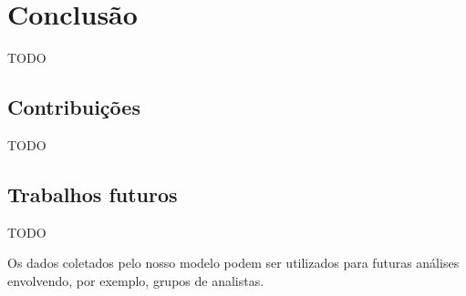 \chapter{Conclusão}
\label{chap:conclusao}

TODO


\section{Contribuições}

TODO

\section{Trabalhos futuros}

TODO

Os dados coletados pelo nosso modelo podem ser utilizados para futuras análises envolvendo, por exemplo, grupos de analistas.